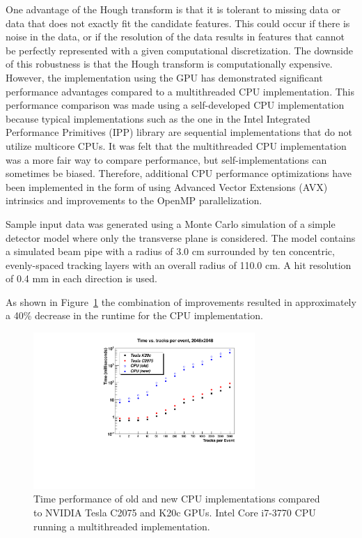 \documentclass[preprint,sort&compress]{elsarticle}
\begin{document}
One advantage of the Hough transform is that it is tolerant to missing data or data that does not exactly fit the candidate features.  This could occur if there is noise in the data, or if the resolution of the data results in features that cannot be perfectly represented with a given computational discretization.  The downside of this robustness is that the Hough transform is computationally expensive.  However, the implementation using the GPU has demonstrated significant performance advantages compared to a multithreaded CPU implementation.  This performance comparison was made using a self-developed CPU implementation because typical implementations such as the one in the Intel Integrated Performance Primitives (IPP) library are sequential implementations that do not utilize multicore CPUs.  It was felt that the multithreaded CPU implementation was a more fair way to compare performance, but self-implementations can sometimes be biased.  Therefore, additional CPU performance optimizations have been implemented in the form of using Advanced Vector Extensions (AVX) intrinsics and improvements to the OpenMP parallelization.

Sample input data was generated using a Monte Carlo simulation of a simple detector model where only the transverse plane is considered.  The model contains a simulated beam pipe with a radius of 3.0 cm surrounded by ten concentric, evenly-spaced tracking layers with an overall radius of 110.0 cm.  A hit resolution of 0.4 mm in each direction is used.

As shown in Figure~\ref{fig:TimePerformance} the combination of improvements resulted in approximately a 40\% decrease in the runtime for the CPU implementation.

\begin{figure}[!Hhtb]
\begin{center}
\includegraphics[width=0.75\textwidth]{TimePerformance.pdf} 
\caption{Time performance of old and new CPU implementations compared to NVIDIA Tesla C2075 and K20c GPUs. 
 Intel Core i7-3770 CPU running a multithreaded implementation.\label{fig:TimePerformance}}
\end{center}
\end{figure}
\end{document}
